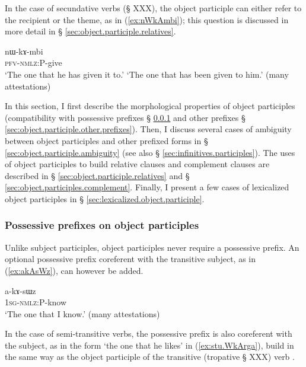 In the case of secundative verbs (§ XXX), the object participle can either refer to the recipient or the theme, as in (\ref{ex:nWkAmbi}); this question is discussed in more detail in § \ref{sec:object.participle.relatives}.

  \begin{exe} 
\ex \label{ex:nWkAmbi}
\gll nɯ-kɤ-mbi \\
   \textsc{pfv}-\textsc{nmlz}:P-give \\
 \glt  `The one that he has given it to.'
 \glt `The one that has been given to him.'  (many attestations)
 \end{exe}

   
 In this section, I first describe the morphological properties of object participles (compatibility with possessive prefixes § \ref{sec:object.participle.possessive} and other prefixes § \ref{sec:object.participle.other.prefixes}). Then, I discuss several cases of ambiguity between object participles and other  prefixed forms in § \ref{sec:object.participle.ambiguity} (see also § \ref{sec:infinitives.participles}). The uses of object participles to build relative clauses and complement clauses are described in  § \ref{sec:object.participle.relatives} and § \ref{sec:object.participles.complement}. Finally, I present a few cases of lexicalized object participles in § \ref{sec:lexicalized.object.participle}.
 
\subsubsection{Possessive prefixes on object participles}  \label{sec:object.participle.possessive} 
Unlike subject participles, object participles never require a possessive prefix. An optional possessive prefix coreferent with the transitive subject, as in (\ref{ex:akAsWz}), can however be added.
  
  \begin{exe}
\ex \label{ex:akAsWz}
\gll a-kɤ-sɯz    \\
   \textsc{1sg-nmlz}:P-know \\
 \glt  `The one that I know.' (many attestations)
 \end{exe}

In the case of semi-transitive verbs, the possessive prefix is also coreferent with the subject, as in the form  `the one that he likes' in (\ref{ex:stu.WkArga}), build in the same way as the object participle of the transitive (tropative § XXX) verb .

